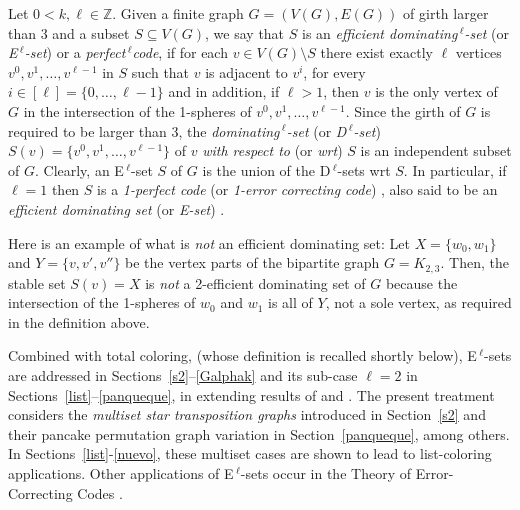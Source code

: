 \documentclass[12pt,reqno]{article}
\begin{document}
Let $0<k,\ell\in\mathbb{Z}$. Given a finite graph $G=(V(G),E(G))$ of girth larger than 3 and a subset $S\subseteq V(G)$, we say that $S$ is an {\it efficient dominating$\,^\ell$-set} (or {\it E$\,^\ell$-set}) or a {\it perfect$\,^\ell\!$code}, if for each $v\in V(G)\setminus S$ there exist exactly $\ell$ vertices $v^0,v^1,\ldots,v^{\ell-1}$ in $S$ such that $v$ is adjacent to  $v^i$, for every $i\in[\ell]=\{0,\ldots,\ell-1\}$ and in addition, if $\ell>1$, then $v$ is the only vertex of $G$ in the intersection of the 1-spheres of  $v^0,v^1,\ldots,v^{\ell-1}$. Since the girth of $G$ is required to be larger than 3, the {\it dominating$\,^\ell$-set} (or {\it D$\,^\ell$-set}) $S(v)=\{v^0,v^1,\ldots,v^{\ell-1}\}$ of $v$ {\it with respect to} (or {\it wrt}) $S$ is an independent subset of $G$. 
Clearly, an E$\,^\ell$-set $S$ of $G$ is the union of the D$\,^\ell$-sets wrt $S$.
In particular, 
 if $\ell=1$ then $S$ is a {\it 1-perfect code} (or {\it 1-error correcting code}) \cite{Borges,D80,Huffman,Vera,MWS}, also said to be an {\it efficient dominating set} (or {\it E-set}) \cite{AK,BBS,gen,D73,D76,edig}. 
 
\begin{example} Here is an example of what is {\it not} an efficient dominating set:
Let $X=\{w_0,w_1\}$ and $Y=\{v,v',v''\}$ be the vertex parts of the bipartite graph $G=K_{2,3}$. Then, the stable set $S(v)=X$ is {\it not} a 2-efficient dominating set of $G$ because  the intersection of the 1-spheres of $w_0$ and $w_1$ is all of $Y$, not a sole vertex, as required in the definition above. 
\end{example}

Combined with total coloring, (whose definition is recalled shortly below),  E$\,^\ell$-sets are addressed in Sections~\ref{s2}--\ref{Galphak} and its sub-case $\ell=2$ in Sections~\ref{list}--\ref{panqueque}, in extending results of \cite{D73} and \cite{cong}. The present treatment considers the {\it multiset star transposition graphs} introduced in Section~\ref{s2} and their pancake permutation graph variation in Section~\ref{panqueque}, among others. In Sections~\ref{list}-\ref{nuevo}, these multiset cases are shown to lead to list-coloring \cite{Erdos,toft,V2} applications. Other  
applications of E$\,^\ell$-sets occur in the Theory of Error-Correcting Codes \cite{Huffman,MWS,Vera}. 
\end{document}

